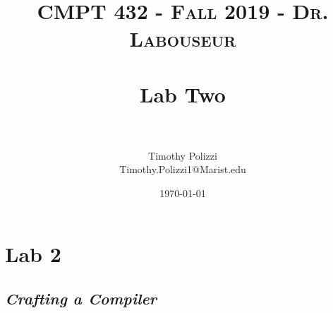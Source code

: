 \documentclass[letterpaper, 10pt]{article}
\title{	
   \normalfont \normalsize 
   \textsc{CMPT 432 - Fall 2019 - Dr. Labouseur} \\[10pt] %
   \horrule{0.5pt} \\[0.25cm] 	%
   \huge Lab Two\\     	    %
   \horrule{0.5pt} \\[0.25cm] 	%
}
\author{Timothy Polizzi \\ \normalsize Timothy.Polizzi1@Marist.edu}
\date{\normalsize\today} 	%
\begin{document}
\maketitle %


\noindent

\section{Lab 2}

\subsection{\textit{Crafting a Compiler}}
\end{document}
